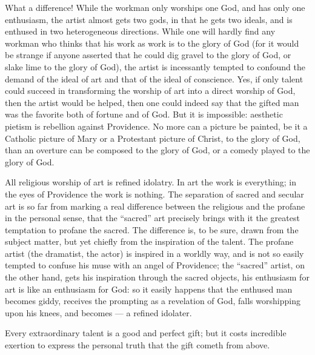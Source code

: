 \documentclass[12pt,a4paper,openany]{book}
\newcommand{\opage}[1]{\marginnote{\footnotesize\textit{[#1]}}}
\begin{document}
What a difference! While the workman only
worships one God, and has only one enthusiasm,
the artist almost gets two gods, in that he
gets two ideals, and is enthused in two heterogeneous
directions. While one will hardly find
any workman who thinks that his work
as work is to the glory of God (for it would
be strange if anyone asserted that he could
dig gravel to the glory of God, or slake lime to the
glory of God), the artist is incessantly tempted
to confound the demand of the ideal of art and that of the ideal of conscience.
Yes, if only talent could succeed
in transforming the worship of art
into a direct worship of God, then the
artist would be helped, then one could indeed
say that the gifted man was the favorite both of fortune and
of God. But it is impossible: aesthetic
pietism is rebellion against Providence.
No more can a picture be painted, be it
\setcounter{footnote}{0}%
\opage{68}a Catholic picture of Mary or a Protestant
picture of Christ, to the glory of God, than an
overture can be composed to the glory of God, or
a comedy played to the glory of God.

All religious worship of art is refined idolatry.
In art the work is everything; in the eyes of
Providence the work is nothing. The separation of
sacred and secular art is so far from
marking a real difference between the religious
and the profane in the personal sense, that
the ``sacred'' art precisely brings with it the greatest
temptation to profane the sacred. The difference is, to be sure, drawn from the subject matter, but yet chiefly
from the inspiration of the talent. The profane
artist (the dramatist, the actor) is inspired
in a worldly way, and is not so easily tempted to
confuse his muse with an angel of Providence;
the ``sacred'' artist, on the other hand, gets his inspiration
through the sacred objects, his
enthusiasm for art is like an enthusiasm for God:
so it easily happens that the enthused man becomes
giddy, receives the prompting as a revelation
of God, falls worshipping upon his knees,
and becomes --- a refined idolater.

Every extraordinary talent is a good and
\setcounter{footnote}{0}%
\opage{69}perfect gift; but it costs incredible exertion
to express the personal truth
that the gift cometh from above.
\end{document}
